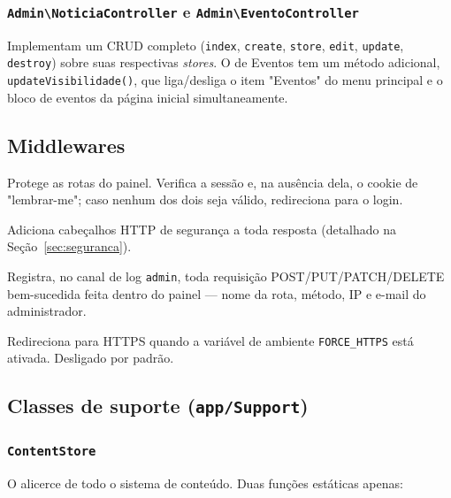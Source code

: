 \documentclass[11pt,a4paper]{article}
\begin{document}
\subsubsection{\texttt{Admin\textbackslash NoticiaController} e \texttt{Admin\textbackslash EventoController}}
Implementam um CRUD completo (\texttt{index}, \texttt{create}, \texttt{store}, \texttt{edit},
\texttt{update}, \texttt{destroy}) sobre suas respectivas \emph{stores}. O de Eventos tem um
método adicional, \texttt{updateVisibilidade()}, que liga/desliga o item "Eventos" do menu
principal e o bloco de eventos da página inicial simultaneamente.

\subsection{Middlewares}

\begin{description}[leftmargin=2em,style=nextline]
    \item[\texttt{EnsureAdminAuthenticated}] Protege as rotas do painel. Verifica a sessão e,
        na ausência dela, o cookie de "lembrar-me"; caso nenhum dos dois seja válido, redireciona
        para o login.
    \item[\texttt{SecurityHeaders}] Adiciona cabeçalhos HTTP de segurança a toda resposta
        (detalhado na Seção~\ref{sec:seguranca}).
    \item[\texttt{AdminAuditLog}] Registra, no canal de log \texttt{admin}, toda requisição
        POST/PUT/PATCH/DELETE bem-sucedida feita dentro do painel — nome da rota, método, IP e
        e-mail do administrador.
    \item[\texttt{EnsureHttps}] Redireciona para HTTPS quando a variável de ambiente
        \texttt{FORCE\_HTTPS} está ativada. Desligado por padrão.
\end{description}

\subsection{Classes de suporte (\texttt{app/Support})}

\subsubsection{\texttt{ContentStore}}
O alicerce de todo o sistema de conteúdo. Duas funções estáticas apenas:
\end{document}
